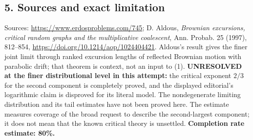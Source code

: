 \subsection*{5. Sources and exact limitation}
Sources: \url{https://www.erdosproblems.com/745}; D. Aldous, \emph{Brownian excursions, critical random graphs and the multiplicative coalescent}, Ann. Probab. 25 (1997), 812--854, \url{https://doi.org/10.1214/aop/1024404421}. Aldous's result gives the finer joint limit through ranked excursion lengths of reflected Brownian motion with parabolic drift; that theorem is context, not an input to (1).
\textbf{UNRESOLVED at the finer distributional level in this attempt:} the critical exponent $2/3$ for the second component is completely proved, and the displayed editorial's logarithmic claim is disproved for its literal model. The nondegenerate limiting distribution and its tail estimates have not been proved here. The estimate measures coverage of the broad request to describe the second-largest component; it does not mean that the known critical theory is unsettled.
\textbf{Completion rate estimate: 80\%.}
